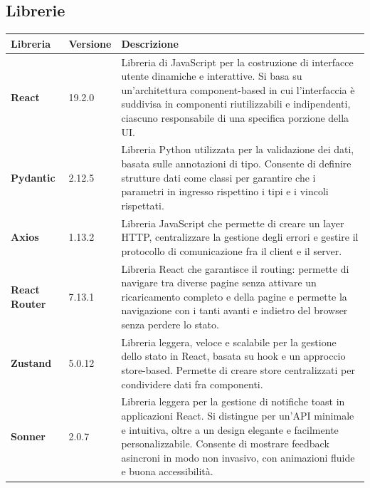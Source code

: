 \documentclass[a4paper,12pt]{article}
\begin{document}
        \subsection{Librerie}
        \begin{center}
            \begin{tabularx}{\textwidth}{|l|l|X|}
                \hline
                \rowcolor{gold}
                \textbf{Libreria}  & \textbf{Versione}  & \textbf{Descrizione}   \\
                \hline
                \textbf{React} & 19.2.0 & Libreria di JavaScript per la costruzione di interfacce utente dinamiche e interattive. Si basa su un'architettura component-based in cui l'interfaccia è suddivisa in componenti riutilizzabili e indipendenti, ciascuno responsabile di una specifica porzione della UI.\\
                \hline
                \textbf{Pydantic} & 2.12.5 & Libreria Python utilizzata per la validazione dei dati, basata sulle annotazioni di tipo. Consente di definire strutture dati come classi per garantire che i parametri in ingresso rispettino i tipi e i vincoli rispettati.\\
                \hline
                \textbf{Axios} & 1.13.2 & Libreria JavaScript che permette di creare un layer HTTP, centralizzare la gestione degli errori e gestire il protocollo di comunicazione fra il client e il server.\\
                \hline
                \textbf{React Router} & 7.13.1 & Libreria React che garantisce il routing: permette di navigare tra diverse pagine senza attivare un ricaricamento completo e della pagine e permette la navigazione con i tanti avanti e indietro del browser senza perdere lo stato.\\
                \hline
                \textbf{Zustand} & 5.0.12 & Libreria leggera, veloce e scalabile per la gestione dello stato in React, basata su hook e un approccio store-based. Permette di creare store centralizzati per condividere dati fra componenti. \\
                \hline
                \textbf{Sonner} & 2.0.7 & Libreria leggera per la gestione di notifiche toast in applicazioni React. Si distingue per un'API minimale e intuitiva, oltre a un design elegante e facilmente personalizzabile. Consente di mostrare feedback asincroni in modo non invasivo, con animazioni fluide e buona accessibilità. \\
                \hline

\end{tabularx}
\end{center}
\end{document}

